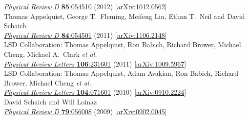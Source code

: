 \begin{spacelistout}
\begin{revnumerate}
      \href{http://dx.doi.org/10.1103/PhysRevD.85.054510}{\textit{Physical Review D} \textbf{85}:054510} (2012) [\href{http://arxiv.org/abs/1012.0562}{arXiv:1012.0562}]
    \pagebreakitem
       \\
      Thomas Appelquist, George T.~Fleming, Meifeng Lin, Ethan T.~Neil and David Schaich \\
      \href{http://dx.doi.org/10.1103/PhysRevD.84.054501}{\textit{Physical Review D} \textbf{84}:054501} (2011) [\href{http://arxiv.org/abs/1106.2148}{arXiv:1106.2148}]
    \pagebreakitem
       \\
      LSD Collaboration: Thomas Appelquist, Ron Babich, Richard Brower, Michael Cheng, Michael A.~Clark \textit{et al.} \\ %
      \href{http://dx.doi.org/10.1103/PhysRevLett.106.231601}{\textit{Physical Review Letters} \textbf{106}:231601} (2011) [\href{http://arxiv.org/abs/1009.5967}{arXiv:1009.5967}]
    \pagebreakitem
       \\
      LSD Collaboration: Thomas Appelquist, Adam Avakian, Ron Babich, Richard Brower, Michael Cheng \textit{et al.} \\ %
      \href{http://dx.doi.org/10.1103/PhysRevLett.104.071601}{\textit{Physical Review Letters} \textbf{104}:071601} (2010) [\href{http://arxiv.org/abs/0910.2224}{arXiv:0910.2224}]
    \pagebreakitem
       \\
      David Schaich and Will Loinaz \\
      \href{http://dx.doi.org/10.1103/PhysRevD.79.056008}{\textit{Physical Review D} \textbf{79}:056008} (2009) [\href{http://arxiv.org/abs/0902.0045}{arXiv:0902.0045}] \\
%
%
%
\newpage \hspace{-22 pt}{\large \bfseries Other articles, theses \& white papers} \vspace{-8 pt}

\end{revnumerate}
\end{spacelistout}
